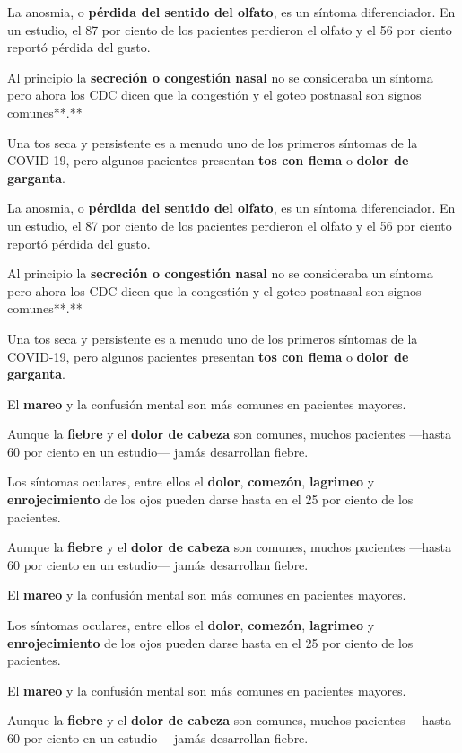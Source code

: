 La anosmia, o \textbf{pérdida del sentido del olfato}, es un síntoma
diferenciador. En un estudio, el 87 por ciento de los pacientes
perdieron el olfato y el 56 por ciento reportó pérdida del gusto.

Al principio la \textbf{secreción o congestión nasal} no se consideraba
un síntoma pero ahora los CDC dicen que la congestión y el goteo
postnasal son signos comunes**.**

Una tos seca y persistente es a menudo uno de los primeros síntomas de
la COVID-19, pero algunos pacientes presentan \textbf{tos con flema} o
\textbf{dolor de garganta}.

La anosmia, o \textbf{pérdida del sentido del olfato}, es un síntoma
diferenciador. En un estudio, el 87 por ciento de los pacientes
perdieron el olfato y el 56 por ciento reportó pérdida del gusto.

Al principio la \textbf{secreción o congestión nasal} no se consideraba
un síntoma pero ahora los CDC dicen que la congestión y el goteo
postnasal son signos comunes**.**

Una tos seca y persistente es a menudo uno de los primeros síntomas de
la COVID-19, pero algunos pacientes presentan \textbf{tos con flema} o
\textbf{dolor de garganta}.

El \textbf{mareo} y la confusión mental son más comunes en pacientes
mayores.

Aunque la \textbf{fiebre} y el \textbf{dolor de cabeza} son comunes,
muchos pacientes ---hasta 60 por ciento en un estudio--- jamás
desarrollan fiebre.

Los síntomas oculares, entre ellos el \textbf{dolor}, \textbf{comezón},
\textbf{lagrimeo} y \textbf{enrojecimiento} de los ojos pueden darse
hasta en el 25 por ciento de los pacientes.

Aunque la \textbf{fiebre} y el \textbf{dolor de cabeza} son comunes,
muchos pacientes ---hasta 60 por ciento en un estudio--- jamás
desarrollan fiebre.

El \textbf{mareo} y la confusión mental son más comunes en pacientes
mayores.

Los síntomas oculares, entre ellos el \textbf{dolor}, \textbf{comezón},
\textbf{lagrimeo} y \textbf{enrojecimiento} de los ojos pueden darse
hasta en el 25 por ciento de los pacientes.

El \textbf{mareo} y la confusión mental son más comunes en pacientes
mayores.

Aunque la \textbf{fiebre} y el \textbf{dolor de cabeza} son comunes,
muchos pacientes ---hasta 60 por ciento en un estudio--- jamás
desarrollan fiebre.

